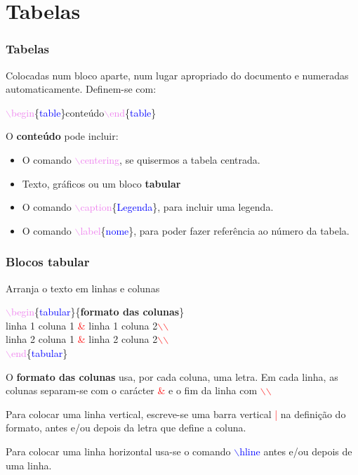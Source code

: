 \documentclass{beamer}
\begin{document}
\section{Tabelas}
\begin{frame}
\frametitle{Tabelas}
Colocadas num bloco aparte, num lugar apropriado do documento e numeradas
automaticamente. Definem-se com:
  
\qquad\textcolor{violet}{$\backslash$begin}\{\textcolor{blue}{table}\}conteúdo\textcolor{violet}{$\backslash$end}\{\textcolor{blue}{table}\}\pause

O \textbf{conteúdo} pode incluir:\pause
\begin{itemize}
\item O comando \textcolor{violet}{$\backslash$centering}, se quisermos
a tabela centrada.\\[12pt]\pause
\item Texto, gráficos ou um bloco \textbf{tabular}\\[12pt]\pause
\item O comando
\textcolor{violet}{$\backslash$caption}\{\textcolor{blue}{Legenda}\},
para incluir uma legenda.\\[12pt]\pause
\item O comando
\textcolor{violet}{$\backslash$label}\{\textcolor{blue}{nome}\}, para poder
fazer referência ao número da tabela.
\end{itemize}
\end{frame}
\begin{frame}
\frametitle{Blocos tabular}
Arranja o texto em linhas e colunas

\quad\textcolor{violet}{$\backslash$begin}\{\textcolor{blue}{tabular}\}\{\textbf{formato das colunas}\}\\
\qquad linha 1 coluna 1 \textcolor{red}{\&} linha 1 coluna 2\textcolor{red}{$\backslash$$\backslash$}\\
\qquad linha 2 coluna 1 \textcolor{red}{\&} linha 2 coluna 2\textcolor{red}{$\backslash$$\backslash$}\\
\quad\textcolor{violet}{$\backslash$end}\{\textcolor{blue}{tabular}\}\pause

O \textbf{formato das colunas} usa, por cada coluna, uma letra. Em
cada linha, as colunas separam-se com o carácter \textcolor{red}{\&} e
o fim da linha com \textcolor{red}{$\backslash$$\backslash$}\pause

Para colocar uma linha vertical, escreve-se uma barra vertical
\textcolor{red}{|} na definição do formato, antes e/ou depois da letra
que define a coluna.\pause

Para colocar uma linha horizontal usa-se o comando
\textcolor{blue}{$\backslash$hline} antes e/ou depois de uma linha.
\end{frame}
\end{document}
